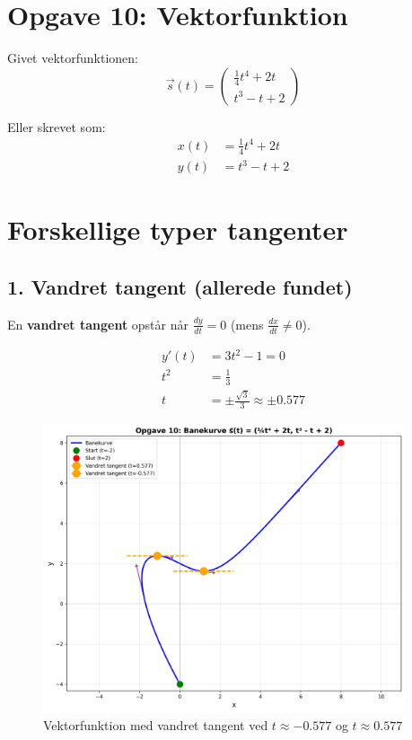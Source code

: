 \documentclass[a4paper,12pt]{article}
\begin{document}
\section{Opgave 10: Vektorfunktion}

Givet vektorfunktionen:
\[
\vec{s}(t) = \begin{pmatrix} \frac{1}{4}t^4 + 2t \\ t^3 - t + 2 \end{pmatrix}
\]

Eller skrevet som:
\begin{align*}
x(t) &= \frac{1}{4}t^4 + 2t \\
y(t) &= t^3 - t + 2
\end{align*}

\section{Forskellige typer tangenter}

\subsection{1. Vandret tangent (allerede fundet)}

En \textbf{vandret tangent} opstår når $\frac{dy}{dt} = 0$ (mens $\frac{dx}{dt} \neq 0$).

\begin{align*}
y'(t) &= 3t^2 - 1 = 0 \\
t^2 &= \frac{1}{3} \\
t &= \pm\frac{\sqrt{3}}{3} \approx \pm 0.577
\end{align*}

\begin{figure}[h]
    \centering
    \includegraphics[width=0.95\textwidth]{opgave_10_banekurve.png}
    \caption{Vektorfunktion med vandret tangent ved $t \approx -0.577$ og $t \approx 0.577$}
\end{figure}
\end{document}
